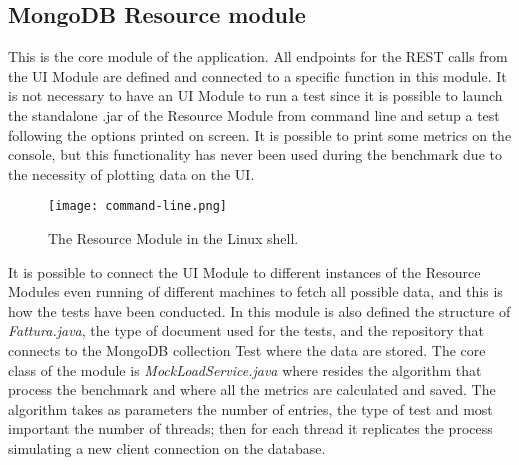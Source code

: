 \subsection{MongoDB Resource module}
This is the core module of the application. All endpoints for the REST calls from the UI Module are defined and connected to a specific function in this module. It is not necessary to have an UI Module to run a test since it is possible to launch the standalone .jar of the Resource Module from command line and setup a test following the options printed on screen. It is possible to print some metrics on the console, but this functionality has never been used during the benchmark due to the necessity of plotting data on the UI.
\begin{figure}[H]
\texttt{[image: command-line.png]}
\centering
\caption{The Resource Module in the Linux shell.}
\end{figure}
It is possible to connect the UI Module to different instances of the Resource Modules even running of different machines to fetch all possible data, and this is how the tests have been conducted.
In this module is also defined the structure of \textit{Fattura.java}, the type of document used for the tests, and the repository that connects to the MongoDB collection Test where the data are stored. The core class of the module is \textit{MockLoadService.java} where resides the algorithm that process the benchmark and where all the metrics are calculated and saved.
The algorithm takes as parameters the number of entries, the type of test and most important the number of threads; then for each thread it replicates the process simulating a new client connection on the database.
